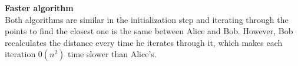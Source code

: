 \documentclass{article}
\begin{document}
\begin{enumerate}[leftmargin=\labelsep]
    \textbf{Faster algorithm}\\
    Both algorithms are similar in the initialization step and iterating through the points to find the closest one is the same between Alice and Bob. However, Bob recalculates the distance every time he iterates through it, which makes each iteration $0(n^2)$ time slower than Alice's.
\end{enumerate}
\end{document}
